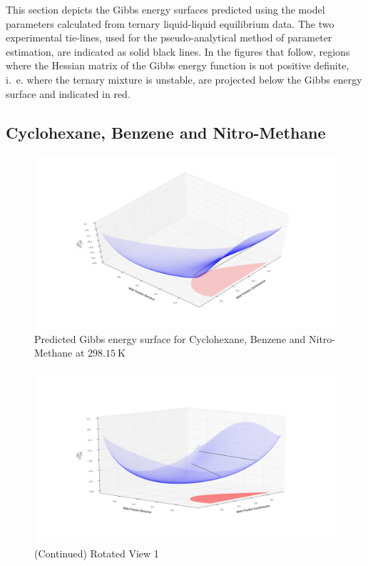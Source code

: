 This section depicts the Gibbs energy surfaces predicted using the model parameters calculated from ternary liquid-liquid equilibrium data. The two experimental tie-lines, used for the pseudo-analytical method of parameter estimation, are indicated as solid black lines. In the figures that follow, regions where the Hessian matrix of the Gibbs energy function is not positive definite, i.~e. where the ternary mixture is unstable, are projected below the  Gibbs energy surface and indicated in red.\\

\subsection{Cyclohexane, Benzene and Nitro-Methane}

\begin{figure}[hp]
 \vspace{40pt}
\centering
\includegraphics[width = \textwidth, bb=100 100 1600 700]{Results_Parts/TernaryParams/cyclohexane-benzene-methanenitro/DWPM/rotation1.png}
\caption{Predicted Gibbs energy surface for Cyclohexane, Benzene and Nitro-Methane at $298.15~\mathrm{K}$}
\end{figure}	

\begin{figure}[hp]
\vspace{40pt}
\ContinuedFloat
\centering
\includegraphics[width = \textwidth, bb=100 100 1600 700]{Results_Parts/TernaryParams/cyclohexane-benzene-methanenitro/DWPM/rotation2.png}
\caption[]{(Continued) Rotated View 1}
\end{figure}

